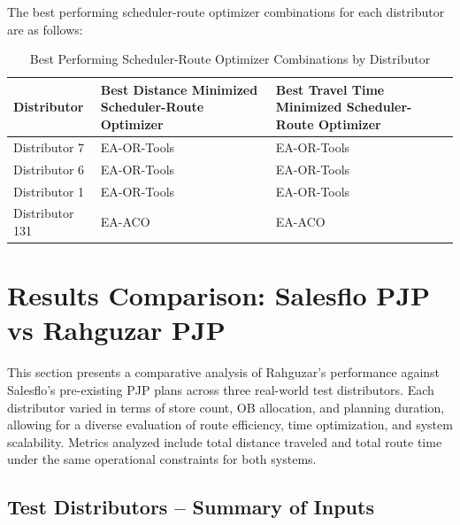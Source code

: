 


The best performing scheduler-route optimizer combinations for each distributor are as follows:

\begin{table}[H]
    \centering
    \renewcommand{\arraystretch}{1.3}
    \caption{Best Performing Scheduler-Route Optimizer Combinations by Distributor}
    \begin{tabular}{|>{\centering\arraybackslash}p{4cm}@{\hskip 0.5cm}|>{\centering\arraybackslash}p{5cm}@{\hskip 0.5cm}|>{\centering\arraybackslash}p{5cm}|}
    \hline
    \textbf{Distributor} & \textbf{Best Distance Minimized Scheduler-Route Optimizer} & \textbf{Best Travel Time Minimized Scheduler-Route Optimizer} \\
    \hline
    Distributor 7 & EA-OR-Tools & EA-OR-Tools \\
    Distributor 6 & EA-OR-Tools & EA-OR-Tools \\
    Distributor 1 & EA-OR-Tools & EA-OR-Tools \\
    Distributor 131 & EA-ACO & EA-ACO \\
    \hline
    \end{tabular}
    \label{tab:best_schedulers}
\end{table}


    
\section{Results Comparison: Salesflo PJP vs Rahguzar PJP}

This section presents a comparative analysis of Rahguzar's performance against Salesflo's pre-existing PJP plans across three real-world test distributors. Each distributor varied in terms of store count, OB allocation, and planning duration, allowing for a diverse evaluation of route efficiency, time optimization, and system scalability. Metrics analyzed include total distance traveled and total route time under the same operational constraints for both systems.
\subsection{Test Distributors – Summary of Inputs}

